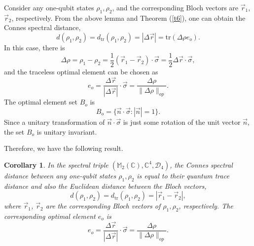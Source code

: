 \documentclass[a4paper,12pt]{article}
\newtheorem{corollary}{Corollary}
\begin{document}
Consider any one-qubit states $\rho_1, \rho_2$, and the corresponding Bloch
vectors are $\vec{r}_1$, $\vec{r}_2$, respectively.
From the above lemma and Theorem (\ref{t6}), one can obtain the Connes spectral distance,
\begin{equation}
	d (\rho_1, \rho_2) = d_{\mathrm{tr}} (\rho_1, \rho_2) = | \Delta \vec{r} | = \mathrm{tr} (\Delta
	\rho e_o) .
\end{equation}
In this case, there is
\begin{equation}
	\Delta \rho =\rho_1-\rho_2= \frac{1}{2} (\vec{r}_1-\vec{r}_2) \cdot \vec{\sigma}= \frac{1}{2} \Delta \vec{r} \cdot \vec{\sigma},
\end{equation}
and the traceless optimal element can be chosen as
\begin{equation}
	e_o = \frac{\Delta \vec{r}}{| \Delta \vec{r} |} \cdot \vec{\sigma} =
	\frac{\Delta \rho}{\| \Delta \rho \|_{op}}.
\end{equation}
The optimal element set $B_o$ is
\begin{equation}
	B_o = \{ \vec{n} \cdot \vec{\sigma} : | \vec{n} | = 1\} .
\end{equation}
Since a unitary transformation of $\vec{n} \cdot \vec{\sigma}$ is just some
rotation of the unit vector $\vec{n}$, the set $B_o$ is unitary invariant.

Therefore, we have the following result.
\begin{corollary}
  In the spectral triple $(\mathbb{M}_2 (\mathbb{C}), \mathbb{C}^4,
  \mathcal{D}_4)$, the Connes spectral distance between any one-qubit states
  $\rho_1, \rho_2$ is equal to their quantum trace distance and also the Euclidean
  distance between the Bloch vectors,
  \begin{equation}
    d (\rho_1, \rho_2) = d_{\mathrm{tr}} (\rho_1, \rho_2) = | \vec{r}_1 - \vec{r}_2 |,
  \end{equation}
  where $\vec{r}_1$, $\vec{r}_2$ are the corresponding Bloch vectors of
  $\rho_1, \rho_2$, respectively. The corresponding optimal element $e_o$ is
  \begin{equation}
    e_o = \frac{\Delta \vec{r}}{| \Delta \vec{r} |} \cdot \vec{\sigma}= \frac{\Delta \rho}{\| \Delta \rho \|_{op}} .
  \end{equation}
\end{corollary}
\end{document}
